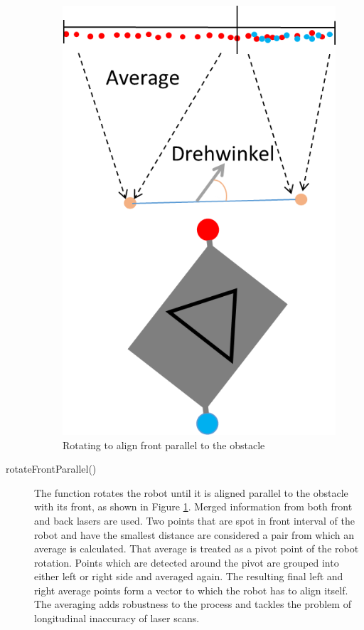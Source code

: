 \begin{description}
\begin{figure}[h]
\centering
\includegraphics[scale=0.6]{graphics/front_parallel.png}
\caption{Rotating to align front parallel to the obstacle}
\label{parallel}
\centering
\end{figure} 
 
\item[rotateFrontParallel()] The function rotates the robot until it is aligned parallel to the obstacle with its front, as shown in Figure \ref{parallel}. Merged information from both front and back lasers are used. Two points that are spot in front interval of the robot and have the smallest distance are considered a pair from which an average is calculated. That average is treated as a pivot point of the robot rotation. Points which are detected around the pivot are grouped into either left or right side and averaged again. The resulting final left and right average points form a vector to which the robot has to align itself. The averaging adds robustness to the process and tackles the problem of longitudinal inaccuracy of laser scans.


\end{description}
